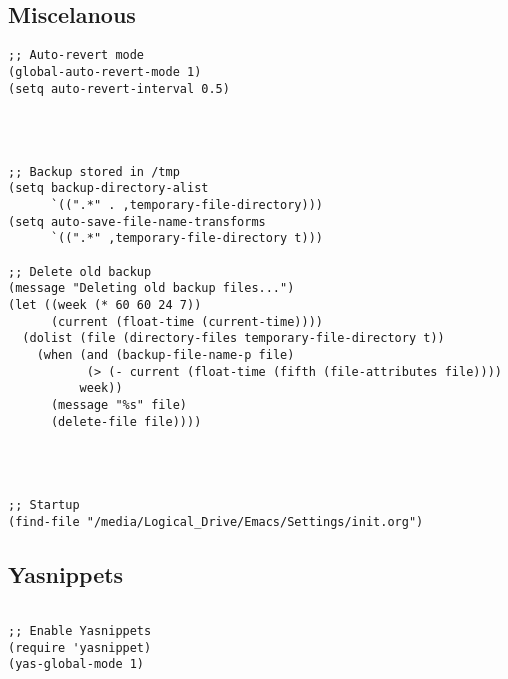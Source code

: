 \documentclass[11pt]{article}
\begin{document}
\subsection{Miscelanous}
\label{sec:orgd4123fd}
\begin{verbatim}
;; Auto-revert mode
(global-auto-revert-mode 1)
(setq auto-revert-interval 0.5)




;; Backup stored in /tmp
(setq backup-directory-alist
      `((".*" . ,temporary-file-directory)))
(setq auto-save-file-name-transforms
      `((".*" ,temporary-file-directory t)))

;; Delete old backup
(message "Deleting old backup files...")
(let ((week (* 60 60 24 7))
      (current (float-time (current-time))))
  (dolist (file (directory-files temporary-file-directory t))
    (when (and (backup-file-name-p file)
	       (> (- current (float-time (fifth (file-attributes file))))
		  week))
      (message "%s" file)
      (delete-file file))))




;; Startup
(find-file "/media/Logical_Drive/Emacs/Settings/init.org")

\end{verbatim}

\subsection{Yasnippets}
\label{sec:org30a80d7}

\begin{verbatim}

;; Enable Yasnippets
(require 'yasnippet)
(yas-global-mode 1)

\end{verbatim}
\end{document}
